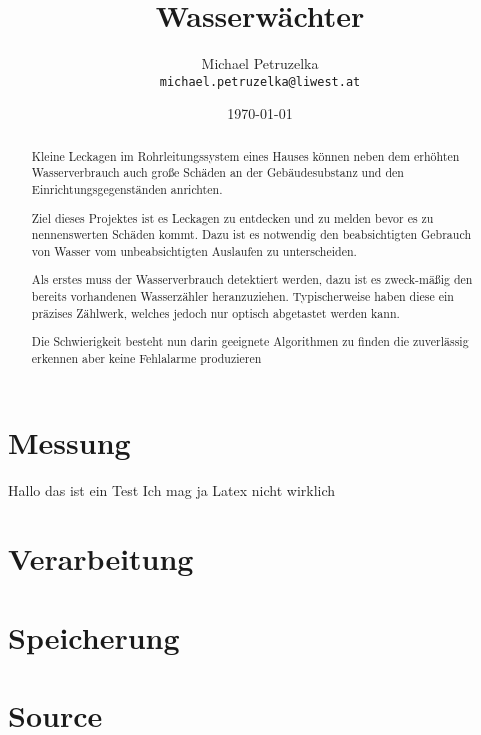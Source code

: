 \documentclass[a4paper,12pt]{report}
\begin{document}
\title{Wasserwächter}
\author{Michael Petruzelka\\
\texttt{michael.petruzelka@liwest.at}}
\date{\today}
\maketitle
\begin{abstract}
Kleine Leckagen im Rohrleitungssystem eines Hauses können neben dem erhöhten Wasserverbrauch auch große Schäden 
an der Gebäudesubstanz und den Einrichtungsgegenständen anrichten. 

Ziel dieses Projektes ist es Leckagen zu entdecken und zu melden bevor es zu nennenswerten Schäden kommt. 
Dazu ist es notwendig den beabsichtigten Gebrauch von Wasser vom unbeabsichtigten Auslaufen zu unterscheiden.

Als erstes muss der Wasserverbrauch detektiert werden, 
dazu ist es zweck-mäßig den bereits vorhandenen Wasserzähler heranzuziehen. 
Typischerweise haben diese ein präzises Zählwerk, welches jedoch nur optisch abgetastet werden kann.

Die Schwierigkeit besteht nun darin geeignete Algorithmen zu finden die zuverlässig erkennen aber keine Fehlalarme produzieren
\end{abstract}
\tableofcontents
\chapter{Messung}
Hallo das ist ein Test
Ich mag ja Latex nicht wirklich
\chapter{Verarbeitung}
\chapter{Speicherung}
\chapter{Source}
\end{document}
